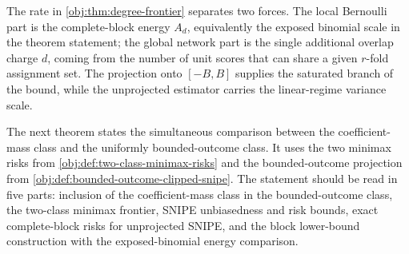 The rate in \cref{obj:thm:degree-frontier} separates two forces. The local Bernoulli part is the complete-block energy \(A_d\), equivalently the exposed binomial scale in the theorem statement; the global network part is the single additional overlap charge \(d\), coming from the number of unit scores that can share a given \(r\)-fold assignment set. The projection onto \([-B,B]\) supplies the saturated branch of the bound, while the unprojected estimator carries the linear-regime variance scale.

The next theorem states the simultaneous comparison between the coefficient-mass class and the uniformly bounded-outcome class. It uses the two minimax risks from \cref{obj:def:two-class-minimax-risks} and the bounded-outcome projection from \cref{obj:def:bounded-outcome-clipped-snipe}. The statement should be read in five parts: inclusion of the coefficient-mass class in the bounded-outcome class, the two-class minimax frontier, SNIPE unbiasedness and risk bounds, exact complete-block risks for unprojected SNIPE, and the block lower-bound construction with the exposed-binomial energy comparison.

